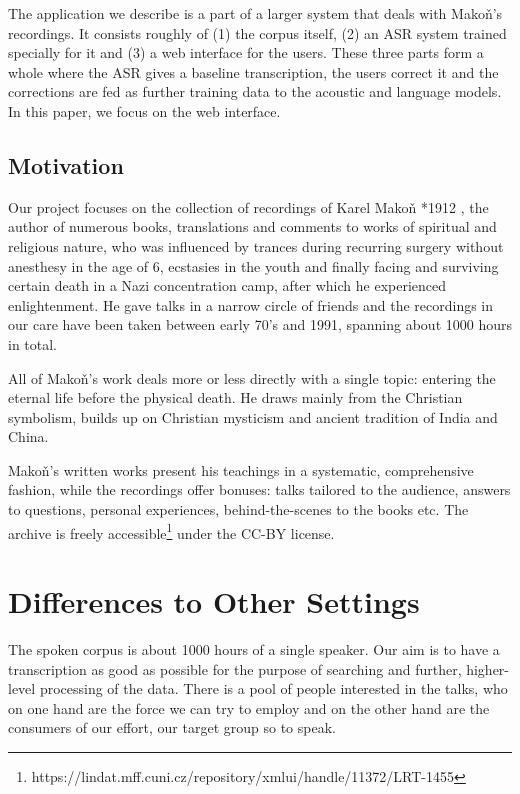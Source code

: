 \documentclass{svproc}
\begin{document}
The application we describe is a part of a larger system that deals with
Mako\v{n}'s recordings. It consists roughly of (1) the corpus itself, (2) an ASR
system trained specially for it and (3) a web interface for the users. These
three parts form a whole where the ASR gives a baseline transcription, the users
correct it and the corrections are fed as further training data to the acoustic
and language models. In this paper, we focus on the web interface.

\subsection{Motivation}

Our project focuses on the collection of recordings of Karel
Mako\v{n}\cite{hajek2007cesky} *1912 , the author of numerous
books, translations and comments to works of spiritual and religious nature, who
was influenced by trances during recurring surgery without anesthesy in the age
of 6, ecstasies in the youth and finally facing and surviving certain death in a
Nazi concentration camp, after which he experienced enlightenment. He gave talks
in a narrow circle of friends and the recordings in our care have been taken
between early 70's and 1991, spanning about 1000 hours in total.

All of Mako\v{n}'s work deals more or less directly with a single topic:
entering the eternal life before the physical death. He draws mainly from the
Christian symbolism, builds up on Christian mysticism and ancient tradition of
India and China.

Mako\v{n}'s written works present his teachings in a systematic, comprehensive
fashion, while the recordings offer bonuses: talks tailored to the audience,
answers to questions, personal experiences, behind-the-scenes to the books etc.
The archive is freely
accessible\footnote{https://lindat.mff.cuni.cz/repository/xmlui/handle/11372/LRT-1455}
under the CC-BY license.

\section{Differences to Other Settings}

The spoken corpus is about 1000 hours of a single
speaker. Our aim is to have a transcription as good as possible for the purpose
of searching and further, higher-level processing of the data. There is a pool
of people interested in the talks, who on one hand are the force we can try to
employ and on the other hand are the consumers of our effort, our target group
so to speak.
\end{document}
